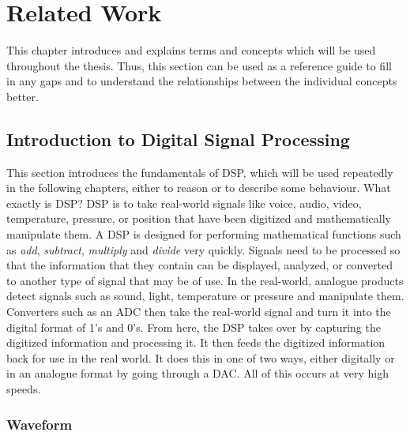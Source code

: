 \chapter{Related Work}
\label{ch:Related-Work}

This chapter introduces and explains terms and concepts which will be used throughout the thesis. Thus, this section can be used as a reference guide to fill in any gaps and to understand the relationships between the individual concepts better.

\section{Introduction to Digital Signal Processing}
\label{sec:Intro-DSP}

This section introduces the fundamentals of \gls{DSP}, which will be used repeatedly in the following chapters, either to reason or to describe some behaviour. 
\newline
\newline
What exactly is \gls{DSP}? \gls{DSP} is to take real-world signals like voice, audio, video, temperature, pressure, or position that have been digitized and mathematically manipulate them. A \gls{DSP} is designed for performing mathematical functions such as \textit{add}, \textit{subtract}, \textit{multiply} and \textit{divide} very quickly.
\newline
\newline
Signals need to be processed so that the information that they contain can be displayed, analyzed, or converted to another type of signal that may be of use. In the real-world, analogue products detect signals such as sound, light, temperature or pressure and manipulate them. Converters such as an \gls{ADC} then take the real-world signal and turn it into the digital format of 1's and 0's. From here, the \gls{DSP} takes over by capturing the digitized information and processing it. It then feeds the digitized information back for use in the real world. It does this in one of two ways, either digitally or in an analogue format by going through a \gls{DAC}. All of this occurs at very high speeds.\footnotemark


\subsection{Waveform}
\label{sub:Waveform}

